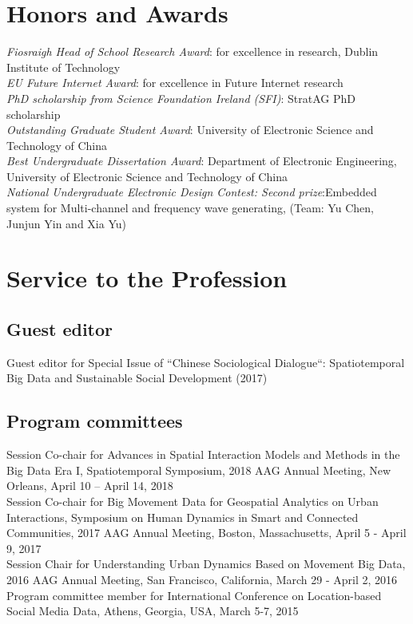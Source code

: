 \documentclass[11pt, a4paper]{article}
\newcommand{\years}[1]{\marginnote{\scriptsize #1}}
\begin{document}
\section*{Honors and Awards}
\noindent
\years{2013}\emph{Fiosraigh Head of School Research Award}: for excellence in research, Dublin Institute of Technology\\
\years{2013}\emph{EU Future Internet Award}: for excellence in Future Internet research\\
\years{2009}\emph{PhD scholarship from Science Foundation Ireland (SFI)}: StratAG PhD scholarship\\
\years{2006}\emph{Outstanding Graduate Student Award}: University of Electronic Science and Technology of China\\
\years{2006}\emph{Best Undergraduate Dissertation Award}: Department of Electronic Engineering, University of Electronic Science and Technology of China\\
\years{2005}\emph{National Undergraduate Electronic Design Contest: Second prize}:Embedded system for Multi-channel and frequency wave generating, (Team: Yu Chen, Junjun Yin and Xia Yu)


\section*{Service to the Profession}
\subsection*{Guest editor}
Guest editor for Special Issue of ``Chinese Sociological Dialogue``: Spatiotemporal Big Data and Sustainable Social Development (2017)
\subsection*{Program committees}
Session Co-chair for Advances in Spatial Interaction Models and Methods in the Big Data Era I, Spatiotemporal Symposium, 2018 AAG Annual Meeting, New Orleans, April 10 – April 14, 2018\\
Session Co-chair for Big Movement Data for Geospatial Analytics on Urban Interactions, Symposium on Human Dynamics in Smart and Connected Communities, 2017 AAG Annual Meeting, Boston, Massachusetts, April 5 - April 9, 2017\\
Session Chair for Understanding Urban Dynamics Based on Movement Big Data, 2016 AAG Annual Meeting, San Francisco, California, March 29 - April 2, 2016\\
Program committee member for International Conference on Location-based Social Media Data, Athens, Georgia, USA, March 5-7, 2015
\end{document}
